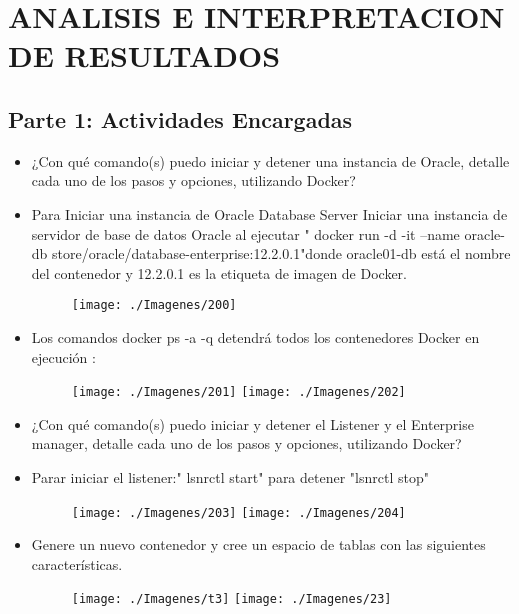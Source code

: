 \section{ANALISIS E INTERPRETACION DE RESULTADOS} 


\subsection{Parte 1: Actividades Encargadas}
	\begin{itemize}
		\item ¿Con qué comando(s) puedo iniciar y detener una instancia de Oracle, detalle cada uno de los pasos y opciones,
utilizando Docker?
                     \item Para  Iniciar una instancia de Oracle Database Server
Iniciar una instancia de servidor de base de datos Oracle al ejecutar
" docker run -d -it --name oracle-db store/oracle/database-enterprise:12.2.0.1"donde oracle01-db está el nombre del contenedor y 12.2.0.1 es la etiqueta de imagen de Docker.
                      \begin{figure}[H]
		\begin{center}
		\texttt{[image: ./Imagenes/200]}
		\end{center}
		\end{figure}
                      \item Los comandos docker ps -a -q detendrá todos los contenedores Docker en ejecución :
                      \begin{figure}[H]
		\begin{center}
		\texttt{[image: ./Imagenes/201]}
                      \texttt{[image: ./Imagenes/202]}
		\end{center}
		\end{figure}
		\item ¿Con qué comando(s) puedo iniciar y detener el Listener y el Enterprise manager, detalle cada uno de los pasos y
opciones, utilizando Docker?
                     \item Parar iniciar el listener:" lsnrctl start"  para detener "lsnrctl stop"
                      \begin{figure}[H]
		\begin{center}
		\texttt{[image: ./Imagenes/203]}
                      \texttt{[image: ./Imagenes/204]}
		\end{center}
		\end{figure}
		\item Genere un nuevo contenedor y cree un espacio de tablas con las siguientes características.
		\begin{figure}[H]
		\begin{center}
		\texttt{[image: ./Imagenes/t3]}
		\texttt{[image: ./Imagenes/23]}
		\end{center}
		\end{figure}


	\end{itemize}



